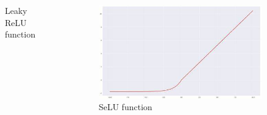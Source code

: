 \documentclass{beamer}
\begin{document}
\begin{frame}
\begin{columns}
\begin{column}{0.33\textwidth}
\begin{figure}
        \caption{Leaky ReLU function}
      \end{figure}
    \end{column}
    \begin{column}{0.33\textwidth}
      \begin{figure}
        \centering
        \includegraphics[width=\textwidth]{selu.jpeg}
        \caption{SeLU function}
      \end{figure}
    \end{column}
  \end{columns}
\end{frame}
\end{document}
